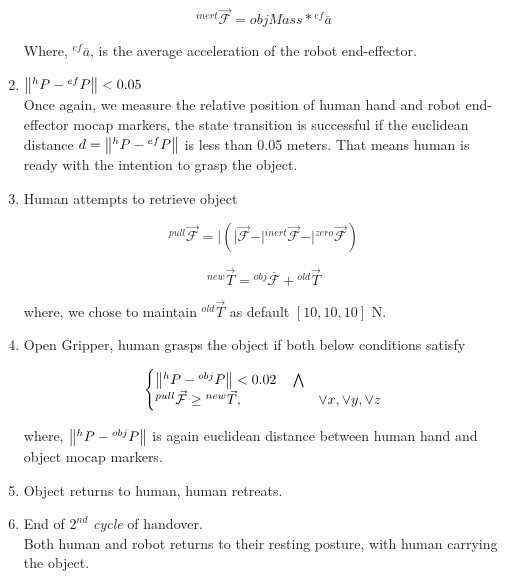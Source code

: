 \begin{enumerate}[start=0,label={\bf{t}\arabic*:}]
    \begin{equation}
        {}^{inert}\vec{\mathcal{F}}  = objMass * {}^{ef}\overline{a}
    \end{equation}

    Where, ${}^{ef}\overline{a}$, is the average acceleration of the robot end-effector.

    \item $\norm{{}^h{P} - {}^{ef}{P}} < 0.05$\\
    Once again, we measure the relative position of human hand and robot end-effector mocap markers, the state transition is successful if the euclidean distance $d = \norm{{}^h{P} - {}^{ef}{P}}$ is less than 0.05 meters. That means human is ready with the intention to grasp the object.
    
    \item Human attempts to retrieve object
    
    \begin{equation}
    {}^{pull}\vec{\mathcal{F}} = \vert{ (\vert{\vec{\mathcal{F}}} - \vert{{}^{inert}\vec{\mathcal{F}}} - \vert{{}^{zero}\vec{\mathcal{F}}}) }
    \end{equation}
    
    \begin{equation}
    {}^{new}\vec{T} = {}^{obj}\overline{\mathcal{F}} + {}^{old}\vec{T}
    \end{equation}
    
    where, we chose to maintain ${}^{old}\vec{T}$ as default $[10, 10, 10]$ N.
    
    \item Open Gripper, human grasps the object if both below conditions satisfy

    \begin{equation}\label{Fpull}
    \begin{cases}
     \norm{{}^h{P} - {}^{obj}{P}} < 0.02 \quad \bigwedge  \\
     {}^{pull}\vec{\mathcal{F}}\geq {}^{new}\vec{T}, & \lor x, \lor y, \lor z
   \end{cases}
   \end{equation}

    where, $\norm{{}^h{P} - {}^{obj}{P}}$ is again euclidean distance between human hand and object mocap markers.

    \item Object returns to human, human retreats.
    
    \item End of $2^{nd}$ \textit{cycle} of handover.\\
    Both human and robot returns to their resting posture, with human carrying the object.
\end{enumerate}
    
